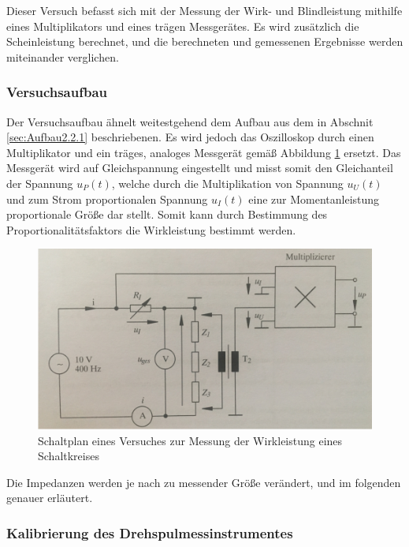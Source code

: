 Dieser Versuch befasst sich mit der Messung der Wirk- und Blindleistung mithilfe eines Multiplikators und eines trägen Messgerätes. Es wird zusätzlich die Scheinleistung berechnet, und die berechneten und gemessenen Ergebnisse werden miteinander verglichen.

\subsubsection{Versuchsaufbau}

Der Versuchsaufbau ähnelt weitestgehend dem Aufbau aus dem in Abschnit \ref{sec:Aufbau2.2.1} beschriebenen. Es wird jedoch das Oszilloskop durch einen Multiplikator und ein träges, analoges Messgerät gemäß Abbildung \ref{fig:Plan2-2} ersetzt. Das Messgerät wird auf Gleichspannung eingestellt und misst somit den Gleichanteil der Spannung $u_P(t)$, welche durch die Multiplikation von Spannung $u_U(t)$ und zum Strom proportionalen Spannung $u_I(t)$ eine zur Momentanleistung proportionale Größe dar stellt. Somit kann durch Bestimmung des Proportionalitätsfaktors die Wirkleistung bestimmt werden.

\begin{figure}[H]
\centering
\includegraphics[width=0.7\linewidth]{Images/Aufbau2-2.png}
\caption{Schaltplan eines Versuches zur Messung der Wirkleistung eines Schaltkreises}
\label{fig:Plan2-2}
\end{figure}

Die Impedanzen werden je nach zu messender Größe verändert, und im folgenden genauer erläutert.

\subsubsection{Kalibrierung des Drehspulmessinstrumentes}

